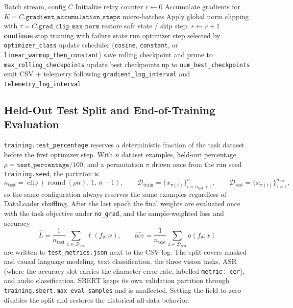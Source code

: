 \begin{algorithm}[t]
\caption{Schema-Driven Training Step with Stability Controls}
\begin{algorithmic}[1]
\Require Batch stream, config $C$
\State Initialize retry counter $r\gets 0$
    \State Accumulate gradients for $K=C.\texttt{gradient\_accumulation\_steps}$ micro-batches
    \State Apply global norm clipping with $\tau=C.\texttt{grad\_clip\_max\_norm}$
            \State restore safe state / skip step; $r \gets r+1$
            \State \textbf{continue}
        \Else
            \State stop training with failure state
        \EndIf
    \EndIf
    \State run optimizer step selected by \texttt{optimizer\_class}
    \State update scheduler (\texttt{cosine}, \texttt{constant}, or \texttt{linear\_warmup\_then\_constant})
        \State save rolling checkpoint and prune to \texttt{max\_rolling\_checkpoints}
    \EndIf
    \State update best checkpoints up to \texttt{num\_best\_checkpoints}
    \State emit CSV + telemetry following \texttt{gradient\_log\_interval} and \texttt{telemetry\_log\_interval}
\EndFor
\end{algorithmic}
\end{algorithm}

\subsection{Held-Out Test Split and End-of-Training Evaluation}

\texttt{training.test\_percentage} reserves a deterministic fraction of the task dataset before the first optimizer step. With $n$ dataset examples, held-out percentage $\rho=\texttt{test\_percentage}/100$, and a permutation $\pi$ drawn once from the run seed \texttt{training.seed}, the partition is
\[
n_{\text{test}}=\operatorname{clip}\!\left(\operatorname{round}(\rho n),\,1,\,n-1\right),\qquad
\mathcal{D}_{\text{train}}=\{x_{\pi(i)}\}_{i=n_{\text{test}}+1}^{n},\qquad
\mathcal{D}_{\text{test}}=\{x_{\pi(i)}\}_{i=1}^{n_{\text{test}}} ,
\]
so the same configuration always reserves the same examples regardless of DataLoader shuffling. After the last epoch the final weights are evaluated once with the task objective under \texttt{no\_grad}, and the sample-weighted loss and accuracy
\[
\hat{L}=\frac{1}{n_{\text{test}}}\sum_{x\in\mathcal{D}_{\text{test}}}\ell(f_\theta;x),\qquad
\widehat{\text{acc}}=\frac{1}{n_{\text{test}}}\sum_{x\in\mathcal{D}_{\text{test}}}a(f_\theta;x)
\]
are written to \texttt{test\_metrics.json} next to the CSV log. The split covers masked and causal language modeling, text classification, the three vision tasks, ASR (where the accuracy slot carries the character error rate, labelled \texttt{metric: cer}), and audio classification. SBERT keeps its own validation partition through \texttt{training.sbert.max\_eval\_samples} and is unaffected. Setting the field to zero disables the split and restores the historical all-data behavior.

